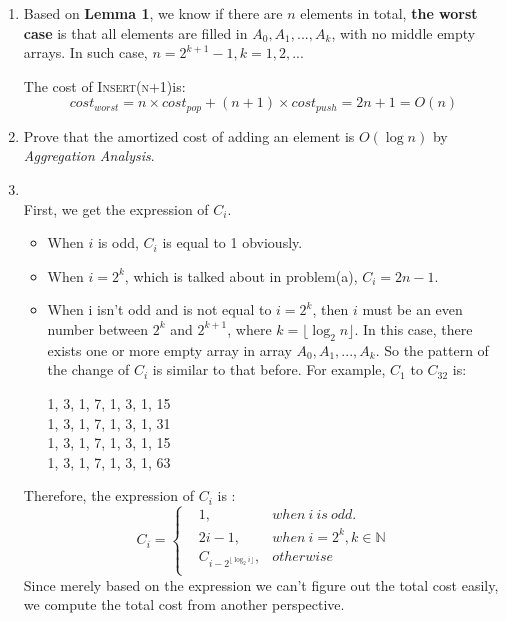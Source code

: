 \documentclass[12pt,a4paper]{article}
\makeatletter
\newtheorem*{solution}{Solution}
\theoremstyle{definition}
\renewenvironment{solution}[1][Solution] {\par\pushQED{\qed}\normalfont\topsep6\p@\@plus6\p@\relax\trivlist\item[\hskip\labelsep\bfseries#1\@addpunct{.}]\ignorespaces}{\popQED\endtrivlist\@endpefalse} \makeatother
\makeatother
\begin{document}
\begin{enumerate}
\begin{enumerate}
\begin{solution}
        Based on \textbf{Lemma 1}, we know if there are $n$ elements in total, \textbf{the worst case} is that all elements are filled in $A_0, A_1,...,A_k$, with no middle empty arrays. In such case, $n=2^{k+1}-1, k =1,2,..$.
        
        The cost of \textsc{Insert(n+1)}is:
        $$
        cost_{worst} = n\times cost_{pop} + (n+1)\times cost_{push} = 2n+1 = O(n)
        $$
        \end{solution}
        
        \item Prove that the amortized cost of adding an element is $O(\log n)$ by \emph{Aggregation Analysis}.
        
        \begin{solution}
        ~\\
        First, we get the expression of $C_i$. 
        \begin{itemize}
            \item 
        When $i$ is odd, $C_i$ is equal to 1 obviously. 
        \item 
        When $i=2^k$, which is talked about in problem(a), $C_i=2n-1$. 
        \item
        When i isn't odd and is not equal to $i=2^k$, then $i$ must be an even number between $2^{k}$ and $2^{k+1}$, where $k=\lfloor \log_2 n\rfloor$. In this case, there exists one or more empty array in array $A_0, A_1,...,A_k$. So the pattern of the change of $C_i$ is similar to that before. For example, $C_1$ to $C_{32}$ is:
        \begin{center}
        
        1, {\color{red}3}, 1, {\color{red}7}, 1, 3, 1, {\color{red}15}\\
        1, 3, 1, 7, 1, 3, 1, {\color{red}31}\\
        1, 3, 1, 7, 1, 3, 1, 15\\
        1, 3, 1, 7, 1, 3, 1, {\color{red}63}\\
        
        \end{center}
        \end{itemize}
        Therefore, the expression of $C_i$ is :
        $$
        C_i = \left\{
        \begin{aligned}
        &1, &when\ i\ is\ odd.\\
        &2i-1, &when\ i=2^k,k\in \mathbb{N}\\
        &C_{i-2 ^{\lfloor \log_2 i\rfloor}} ,&otherwise\\
        \end{aligned}
        \right.
        $$
        Since merely based on the expression we can't figure out the total cost easily, we compute the total cost from another  perspective. 
        ~\\
        

\end{solution}
\end{enumerate}
\end{enumerate}
\end{document}
